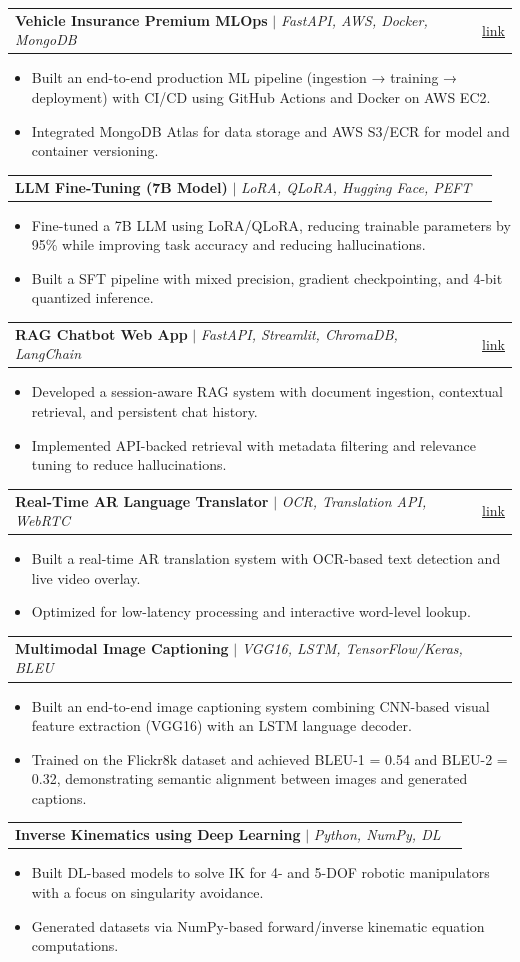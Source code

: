 \documentclass[letterpaper,11pt]{article}
\makeatletter
\newcommand{\resumeItem}[1]{\item\small{{#1 \vspace{-2pt}}}}
\newcommand{\resumeProjectHeading}[2]{
    \item
    \begin{tabular*}{0.97\textwidth}{l@{\extracolsep{\fill}}r}
      \small#1 & #2 \\
    \end{tabular*}\vspace{-7pt}
}
\newcommand{\resumeItemListStart}{\begin{itemize}}
\newcommand{\resumeItemListEnd}{\end{itemize}\vspace{-5pt}}
\makeatother
\begin{document}
\resumeProjectHeading{\textbf{Vehicle Insurance Premium MLOps} $|$ \emph{FastAPI, AWS, Docker, MongoDB}}{\href{https://huggingface.co/spaces/RohitHiwal/vehicle-insurance-prediction}{\color{SkyBlue}link}}
\resumeItemListStart
  \resumeItem{Built an end-to-end production ML pipeline (ingestion → training → deployment) with CI/CD using GitHub Actions and Docker on AWS EC2.}
  \resumeItem{Integrated MongoDB Atlas for data storage and AWS S3/ECR for model and container versioning.}
\resumeItemListEnd

\resumeProjectHeading{\textbf{LLM Fine-Tuning (7B Model)} $|$ \emph{LoRA, QLoRA, Hugging Face, PEFT}}{}
\resumeItemListStart
  \resumeItem{Fine-tuned a 7B LLM using LoRA/QLoRA, reducing trainable parameters by 95\% while improving task accuracy and reducing hallucinations.}
  \resumeItem{Built a SFT pipeline with mixed precision, gradient checkpointing, and 4-bit quantized inference.}
\resumeItemListEnd

\resumeProjectHeading{\textbf{RAG Chatbot Web App} $|$ \emph{FastAPI, Streamlit, ChromaDB, LangChain}}{\href{https://rag-chat-lpzi2tw6gjm7mrvflc35kn.streamlit.app/}{\color{SkyBlue}link}}
\resumeItemListStart
  \resumeItem{Developed a session-aware RAG system with document ingestion, contextual retrieval, and persistent chat history.}
  \resumeItem{Implemented API-backed retrieval with metadata filtering and relevance tuning to reduce hallucinations.}
\resumeItemListEnd

\resumeProjectHeading{\textbf{Real-Time AR Language Translator} $|$ \emph{OCR, Translation API, WebRTC}}{\href{https://huggingface.co/spaces/RohitHiwal/Real_Time_AR_Translator}{\color{SkyBlue}link}}{}
\resumeItemListStart
  \resumeItem{Built a real-time AR translation system with OCR-based text detection and live video overlay.}
  \resumeItem{Optimized for low-latency processing and interactive word-level lookup.}
\resumeItemListEnd

\resumeProjectHeading{\textbf{Multimodal Image Captioning} $|$ \emph{VGG16, LSTM, TensorFlow/Keras, BLEU}}{}
\resumeItemListStart
  \resumeItem{Built an end-to-end image captioning system combining CNN-based visual feature extraction (VGG16) with an LSTM language decoder.}
  \resumeItem{Trained on the Flickr8k dataset and achieved BLEU-1 = 0.54 and BLEU-2 = 0.32, demonstrating semantic alignment between images and generated captions.}
\resumeItemListEnd

\resumeProjectHeading{\textbf{Inverse Kinematics using Deep Learning} $|$ \emph{Python, NumPy, DL}}{}
    \resumeItemListStart
      \resumeItem{Built DL-based models to solve IK for 4- and 5-DOF robotic manipulators with a focus on singularity avoidance.}
      \resumeItem{Generated datasets via NumPy-based forward/inverse kinematic equation computations.}
    \resumeItemListEnd
\end{document}
